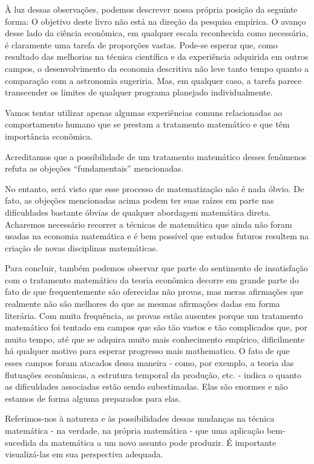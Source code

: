 \documentclass[12pt]{article}
\begin{document}
À luz dessas observações, podemos descrever nossa própria posição da seguinte forma: O objetivo deste livro não está na direção da pesquisa empírica. O avanço desse lado da ciência econômica, em qualquer escala reconhecida como necessária, é claramente uma tarefa de proporções vastas. Pode-se esperar que, como resultado das melhorias na técnica científica e da experiência adquirida em outros campos, o desenvolvimento da economia descritiva não leve tanto tempo quanto a comparação com a astronomia sugeriria. Mas, em qualquer caso, a tarefa parece transcender os limites de qualquer programa planejado individualmente.

Vamos tentar utilizar apenas algumas experiências comuns relacionadas ao comportamento humano que se prestam a tratamento matemático e que têm importância econômica.

Acreditamos que a possibilidade de um tratamento matemático desses fenômenos refuta as objeções “fundamentais” mencionadas.

No entanto, será visto que esse processo de matematização não é nada óbvio. De fato, as objeções mencionadas acima podem ter suas raízes em parte nas dificuldades bastante óbvias de qualquer abordagem matemática direta. Acharemos necessário recorrer a técnicas de matemática que ainda não foram usadas na economia matemática e é bem possível que estudos futuros resultem na criação de novas disciplinas matemáticas.

Para concluir, também podemos observar que parte do sentimento de insatisfação com o tratamento matemático da teoria econômica decorre em grande parte do fato de que frequentemente são oferecidas não provas, mas meras afirmações que realmente não são melhores do que as mesmas afirmações dadas em forma literária. Com muita frequência, as provas estão ausentes porque um tratamento matemático foi tentado em campos que são tão vastos e tão complicados que, por muito tempo, até que se adquira muito mais conhecimento empírico, dificilmente há qualquer motivo para esperar progresso mais mathematico. O fato de que esses campos foram atacados dessa maneira - como, por exemplo, a teoria das flutuações econômicas, a estrutura temporal da produção, etc. - indica o quanto as dificuldades associadas estão sendo subestimadas. Elas são enormes e não estamos de forma alguma preparados para elas.

Referimos-nos à natureza e às possibilidades dessas mudanças na técnica matemática - na verdade, na própria matemática - que uma aplicação bem-sucedida da matemática a um novo assunto pode produzir. É importante visualizá-las em sua perspectiva adequada.
\end{document}

